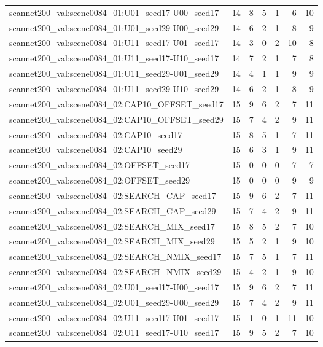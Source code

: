 \begin{table}[t]
\begin{tabular}{lrrrrrr}
scannet200\_val:scene0084\_01:U01\_seed17-U00\_seed17 & 14 & 8 & 5 & 1 & 6 & 10 \\
scannet200\_val:scene0084\_01:U01\_seed29-U00\_seed29 & 14 & 6 & 2 & 1 & 8 & 9 \\
scannet200\_val:scene0084\_01:U11\_seed17-U01\_seed17 & 14 & 3 & 0 & 2 & 10 & 8 \\
scannet200\_val:scene0084\_01:U11\_seed17-U10\_seed17 & 14 & 7 & 2 & 1 & 7 & 8 \\
scannet200\_val:scene0084\_01:U11\_seed29-U01\_seed29 & 14 & 4 & 1 & 1 & 9 & 9 \\
scannet200\_val:scene0084\_01:U11\_seed29-U10\_seed29 & 14 & 6 & 2 & 1 & 8 & 9 \\
scannet200\_val:scene0084\_02:CAP10\_OFFSET\_seed17 & 15 & 9 & 6 & 2 & 7 & 11 \\
scannet200\_val:scene0084\_02:CAP10\_OFFSET\_seed29 & 15 & 7 & 4 & 2 & 9 & 11 \\
scannet200\_val:scene0084\_02:CAP10\_seed17 & 15 & 8 & 5 & 1 & 7 & 11 \\
scannet200\_val:scene0084\_02:CAP10\_seed29 & 15 & 6 & 3 & 1 & 9 & 11 \\
scannet200\_val:scene0084\_02:OFFSET\_seed17 & 15 & 0 & 0 & 0 & 7 & 7 \\
scannet200\_val:scene0084\_02:OFFSET\_seed29 & 15 & 0 & 0 & 0 & 9 & 9 \\
scannet200\_val:scene0084\_02:SEARCH\_CAP\_seed17 & 15 & 9 & 6 & 2 & 7 & 11 \\
scannet200\_val:scene0084\_02:SEARCH\_CAP\_seed29 & 15 & 7 & 4 & 2 & 9 & 11 \\
scannet200\_val:scene0084\_02:SEARCH\_MIX\_seed17 & 15 & 8 & 5 & 2 & 7 & 10 \\
scannet200\_val:scene0084\_02:SEARCH\_MIX\_seed29 & 15 & 5 & 2 & 1 & 9 & 10 \\
scannet200\_val:scene0084\_02:SEARCH\_NMIX\_seed17 & 15 & 7 & 5 & 1 & 7 & 11 \\
scannet200\_val:scene0084\_02:SEARCH\_NMIX\_seed29 & 15 & 4 & 2 & 1 & 9 & 10 \\
scannet200\_val:scene0084\_02:U01\_seed17-U00\_seed17 & 15 & 9 & 6 & 2 & 7 & 11 \\
scannet200\_val:scene0084\_02:U01\_seed29-U00\_seed29 & 15 & 7 & 4 & 2 & 9 & 11 \\
scannet200\_val:scene0084\_02:U11\_seed17-U01\_seed17 & 15 & 1 & 0 & 1 & 11 & 10 \\
scannet200\_val:scene0084\_02:U11\_seed17-U10\_seed17 & 15 & 9 & 5 & 2 & 7 & 10 \\

\end{tabular}
\end{table}
